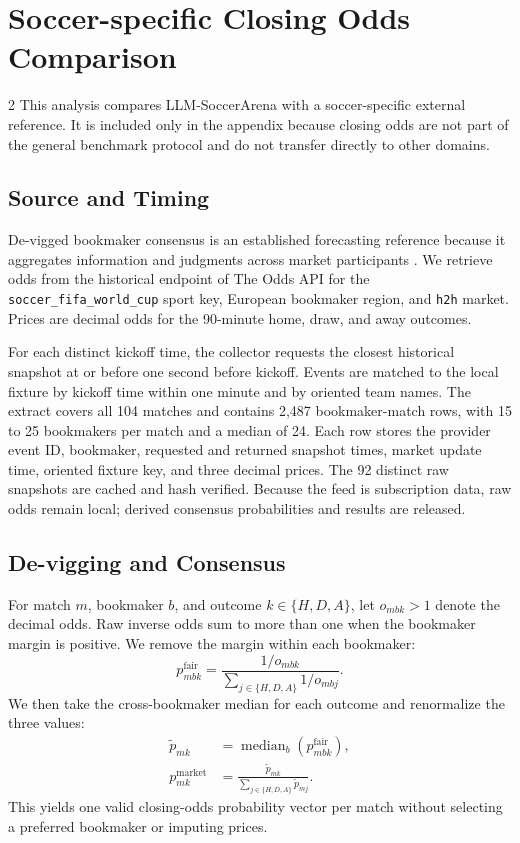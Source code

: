\documentclass[sigconf,nonacm]{acmart}
\newcommand{\arena}{\mbox{LLM-SoccerArena}\xspace}
\begin{document}
\section{Soccer-specific Closing Odds Comparison}
\label{app:odds-comparison}

\begin{multicols}{2}
This analysis compares \arena with a soccer-specific external reference. It is included only in the appendix because closing odds are not part of the general benchmark protocol and do not transfer directly to other domains.

\subsection{Source and Timing}

De-vigged bookmaker consensus is an established forecasting reference because it aggregates information and judgments across market participants \citep{leitner_etal_2010,zeileis_etal_2018}. We retrieve odds from the historical endpoint of The Odds API for the \texttt{soccer\_fifa\_world\_cup} sport key, European bookmaker region, and \texttt{h2h} market. Prices are decimal odds for the 90-minute home, draw, and away outcomes.

For each distinct kickoff time, the collector requests the closest historical snapshot at or before one second before kickoff. Events are matched to the local fixture by kickoff time within one minute and by oriented team names. The extract covers all 104 matches and contains 2,487 bookmaker-match rows, with 15 to 25 bookmakers per match and a median of 24. Each row stores the provider event ID, bookmaker, requested and returned snapshot times, market update time, oriented fixture key, and three decimal prices. The 92 distinct raw snapshots are cached and hash verified. Because the feed is subscription data, raw odds remain local; derived consensus probabilities and results are released.

\subsection{De-vigging and Consensus}

For match $m$, bookmaker $b$, and outcome $k\in\{H,D,A\}$, let $o_{mbk}>1$ denote the decimal odds. Raw inverse odds sum to more than one when the bookmaker margin is positive. We remove the margin within each bookmaker:
\begin{equation}
  p_{mbk}^{\mathrm{fair}}
  = \frac{1/o_{mbk}}{\sum_{j\in\{H,D,A\}} 1/o_{mbj}}.
  \label{eq:devig}
\end{equation}
We then take the cross-bookmaker median for each outcome and renormalize the three values:
\begin{align}
  \widetilde p_{mk}
  &= \operatorname{median}_{b}\!\left(p_{mbk}^{\mathrm{fair}}\right), \\
  p_{mk}^{\mathrm{market}}
  &= \frac{\widetilde p_{mk}}{\sum_{j\in\{H,D,A\}}\widetilde p_{mj}}.
  \label{eq:market-consensus}
\end{align}
This yields one valid closing-odds probability vector per match without selecting a preferred bookmaker or imputing prices.


\end{multicols}
\end{document}
